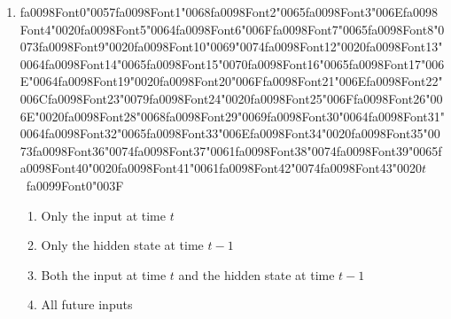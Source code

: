 \documentclass[12pt]{article}
\begin{document}
\begin{enumerate}[label=Q\arabic*.]
\begin{enumerate}[label=(\Alph*)]
    \item The current word given itself
    \item All words simultaneously
\end{enumerate}
\item {\csname fa0098Font0\endcsname\char"0057}{\csname fa0098Font1\endcsname\char"0068}{\csname fa0098Font2\endcsname\char"0065}{\csname fa0098Font3\endcsname\char"006E}{\csname fa0098Font4\endcsname\char"0020}{\csname fa0098Font5\endcsname\char"0064}{\csname fa0098Font6\endcsname\char"006F}{\csname fa0098Font7\endcsname\char"0065}{\csname fa0098Font8\endcsname\char"0073}{\csname fa0098Font9\endcsname\char"0020}{\csname fa0098Font10\endcsname\char"0069}{\char"0074}{\csname fa0098Font12\endcsname\char"0020}{\csname fa0098Font13\endcsname\char"0064}{\csname fa0098Font14\endcsname\char"0065}{\csname fa0098Font15\endcsname\char"0070}{\csname fa0098Font16\endcsname\char"0065}{\csname fa0098Font17\endcsname\char"006E}{\char"0064}{\csname fa0098Font19\endcsname\char"0020}{\csname fa0098Font20\endcsname\char"006F}{\csname fa0098Font21\endcsname\char"006E}{\csname fa0098Font22\endcsname\char"006C}{\csname fa0098Font23\endcsname\char"0079}{\csname fa0098Font24\endcsname\char"0020}{\csname fa0098Font25\endcsname\char"006F}{\csname fa0098Font26\endcsname\char"006E}{\char"0020}{\csname fa0098Font28\endcsname\char"0068}{\csname fa0098Font29\endcsname\char"0069}{\csname fa0098Font30\endcsname\char"0064}{\csname fa0098Font31\endcsname\char"0064}{\csname fa0098Font32\endcsname\char"0065}{\csname fa0098Font33\endcsname\char"006E}{\csname fa0098Font34\endcsname\char"0020}{\csname fa0098Font35\endcsname\char"0073}{\csname fa0098Font36\endcsname\char"0074}{\csname fa0098Font37\endcsname\char"0061}{\csname fa0098Font38\endcsname\char"0074}{\csname fa0098Font39\endcsname\char"0065}{\csname fa0098Font40\endcsname\char"0020}{\csname fa0098Font41\endcsname\char"0061}{\csname fa0098Font42\endcsname\char"0074}{\csname fa0098Font43\endcsname\char"0020}$t$\ {\csname fa0099Font0\endcsname\char"003F}
\begin{enumerate}[label=(\Alph*)]
    \item Only the input at time $t$
    \item Only the hidden state at time $t-1$
    \item Both the input at time $t$ and the hidden state at time $t-1$
    \item All future inputs
\end{enumerate}

\end{enumerate}
\end{document}
